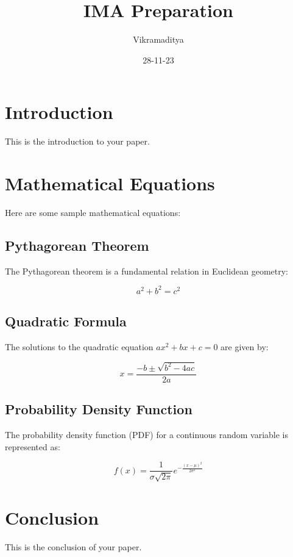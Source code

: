 \documentclass{article}
\title{IMA Preparation}
\author{Vikramaditya}
\date{28-11-23}
\begin{document}
\maketitle

\section{Introduction}

This is the introduction to your paper.

\section{Mathematical Equations}

Here are some sample mathematical equations:

\subsection{Pythagorean Theorem}

The Pythagorean theorem is a fundamental relation in Euclidean geometry:

\begin{equation}
a^2 + b^2 = c^2
\end{equation}

\subsection{Quadratic Formula}

The solutions to the quadratic equation $ax^2 + bx + c = 0$ are given by:

\begin{equation}
x = \frac{-b \pm \sqrt{b^2 - 4ac}}{2a}
\end{equation}

\subsection{Probability Density Function}

The probability density function (PDF) for a continuous random variable is represented as:

\begin{equation}
f(x) = \frac{1}{\sigma \sqrt{2\pi}} e^{-\frac{(x - \mu)^2}{2\sigma^2}}
\end{equation}

\section{Conclusion}

This is the conclusion of your paper.
\end{document}
